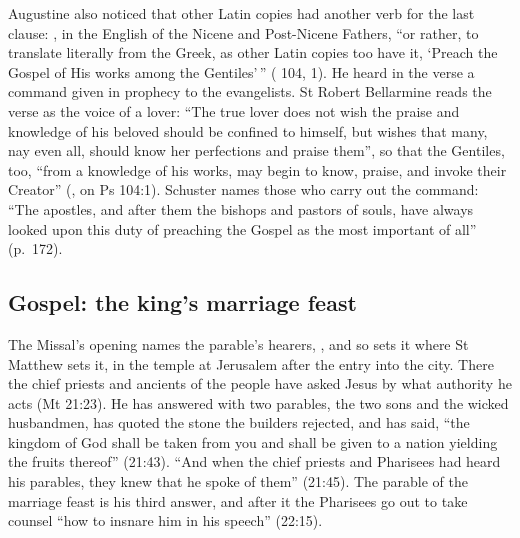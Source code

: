 Augustine also noticed that other Latin copies had another verb for the last
clause: , in the English of the Nicene and Post-Nicene Fathers, ``or rather,
to translate literally from the Greek, as other Latin copies too have it,
`Preach the Gospel of His works among the Gentiles'\,'' (
104, 1). He heard in the verse a command given in prophecy to the evangelists. St Robert Bellarmine reads the verse as the voice of a lover:
``The true lover does not wish the praise and knowledge of his beloved should
be confined to himself, but wishes that many, nay even all, should know her
perfections and praise them'', so that the Gentiles, too, ``from a knowledge of
his works, may begin to know, praise, and invoke their Creator''
(, on Ps 104:1). Schuster names those who carry
out the command: ``The apostles, and after them the bishops and pastors of
souls, have always looked upon this duty of preaching the Gospel as the most
important of all'' (p.~172).

\subsection{Gospel: the king's marriage feast}

The Missal's opening names the parable's hearers, , and so sets it where St Matthew sets it, in the temple at
Jerusalem after the entry into the city. There the chief priests and ancients
of the people have asked Jesus by what authority he acts (Mt 21:23). He has
answered with two parables, the two sons and the wicked husbandmen, has
quoted the stone the builders rejected, and has said, ``the kingdom of God
shall be taken from you and shall be given to a nation yielding the fruits
thereof'' (21:43). ``And when the chief priests and Pharisees had heard his
parables, they knew that he spoke of them'' (21:45). The parable of the
marriage feast is his third answer, and after it the Pharisees go out to take
counsel ``how to insnare him in his speech'' (22:15).

